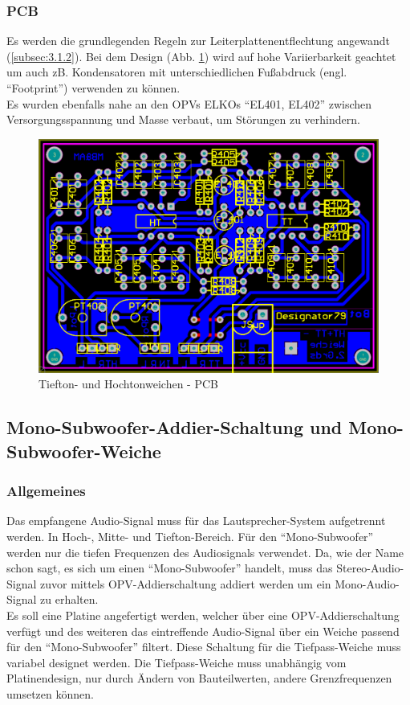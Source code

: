 \subsubsection{PCB}\label{subsec:4.3.3}
Es werden die grundlegenden Regeln zur Leiterplattenentflechtung angewandt (\ref{subsec:3.1.2}).
Bei dem Design (Abb. \ref{fig:4.3.3.1}) wird auf hohe Variierbarkeit geachtet um auch zB. Kondensatoren mit unterschiedlichen Fußabdruck (engl. \enquote{Footprint}) verwenden zu können.\\
Es wurden ebenfalls nahe an den OPVs ELKOs \enquote{EL401, EL402} zwischen Versorgungsspannung und Masse verbaut, um Störungen zu verhindern.
\begin{figure} [H]
	\centering	
	\includegraphics[width=1\textwidth]{img/Print4/4_TTuHTWeiche-PCB.PNG}
	\caption{Tiefton- und Hochtonweichen - PCB}
	\label {fig:4.3.3.1}
\end{figure}


\newpage
\subsection*{Mono-Subwoofer-Addier-Schaltung und Mono-Subwoofer-Weiche}\label{sec:4.2}
\subsubsection{Allgemeines}\label{susec:4.2.1}
Das empfangene Audio-Signal muss für das Lautsprecher-System aufgetrennt werden. In Hoch-, Mitte- und Tiefton-Bereich.
Für den \enquote{Mono-Subwoofer} werden nur die tiefen Frequenzen des Audiosignals verwendet.
Da, wie der Name schon sagt, es sich um einen \enquote{Mono-Subwoofer} handelt, muss das Stereo-Audio-Signal zuvor mittels OPV-Addierschaltung addiert werden um ein Mono-Audio-Signal zu erhalten.\\
Es soll eine Platine angefertigt werden, welcher über eine OPV-Addierschaltung verfügt und des weiteren das eintreffende Audio-Signal über ein Weiche passend für den \enquote{Mono-Subwoofer} filtert.
Diese Schaltung für die Tiefpass-Weiche muss variabel designet werden. Die Tiefpass-Weiche muss unabhängig vom Platinendesign, nur durch Ändern von Bauteilwerten, andere Grenzfrequenzen umsetzen können.

